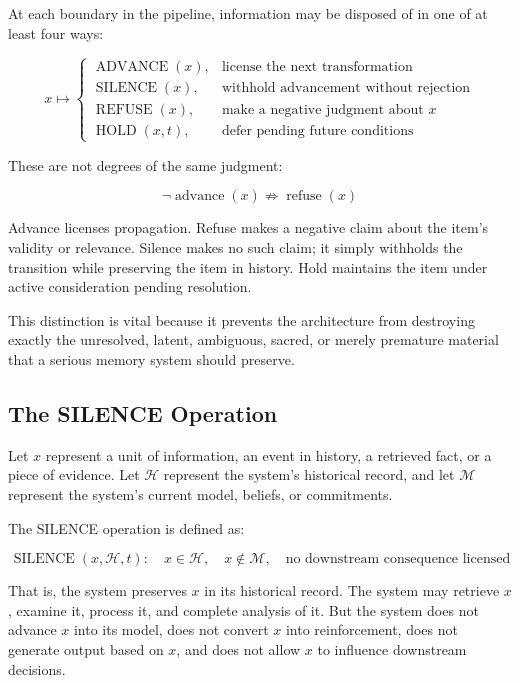 \documentclass[12pt]{article}
\begin{document}
At each boundary in the pipeline, information may be disposed of in one of at least four ways:

\begin{equation}
x \longmapsto \begin{cases}
\operatorname{ADVANCE}(x), & \text{license the next transformation}\\
\operatorname{SILENCE}(x), & \text{withhold advancement without rejection}\\
\operatorname{REFUSE}(x), & \text{make a negative judgment about } x\\
\operatorname{HOLD}(x, t), & \text{defer pending future conditions}
\end{cases}
\end{equation}

These are not degrees of the same judgment:

\begin{equation}
\boxed{\neg\operatorname{advance}(x) \not\Rightarrow \operatorname{refuse}(x)}
\end{equation}

Advance licenses propagation. Refuse makes a negative claim about the item's validity or relevance. Silence makes no such claim; it simply withholds the transition while preserving the item in history. Hold maintains the item under active consideration pending resolution.

This distinction is vital because it prevents the architecture from destroying exactly the unresolved, latent, ambiguous, sacred, or merely premature material that a serious memory system should preserve.

\subsection{The SILENCE Operation}

Let $x$ represent a unit of information, an event in history, a retrieved fact, or a piece of evidence. Let $\mathcal{H}$ represent the system's historical record, and let $\mathcal{M}$ represent the system's current model, beliefs, or commitments.

The SILENCE operation is defined as:

\begin{equation}
\operatorname{SILENCE}(x, \mathcal{H}, t): \quad x \in \mathcal{H}, \quad x \notin \mathcal{M}, \quad \text{no downstream consequence licensed}
\end{equation}

That is, the system preserves $x$ in its historical record. The system may retrieve $x$, examine it, process it, and complete analysis of it. But the system does not advance $x$ into its model, does not convert $x$ into reinforcement, does not generate output based on $x$, and does not allow $x$ to influence downstream decisions.
\end{document}

